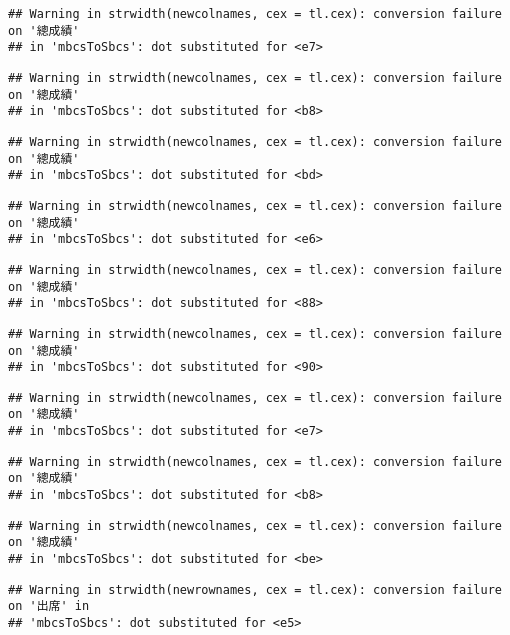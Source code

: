 \documentclass[
]{book}
\begin{document}
\begin{verbatim}
## Warning in strwidth(newcolnames, cex = tl.cex): conversion failure on '總成績'
## in 'mbcsToSbcs': dot substituted for <e7>
\end{verbatim}

\begin{verbatim}
## Warning in strwidth(newcolnames, cex = tl.cex): conversion failure on '總成績'
## in 'mbcsToSbcs': dot substituted for <b8>
\end{verbatim}

\begin{verbatim}
## Warning in strwidth(newcolnames, cex = tl.cex): conversion failure on '總成績'
## in 'mbcsToSbcs': dot substituted for <bd>
\end{verbatim}

\begin{verbatim}
## Warning in strwidth(newcolnames, cex = tl.cex): conversion failure on '總成績'
## in 'mbcsToSbcs': dot substituted for <e6>
\end{verbatim}

\begin{verbatim}
## Warning in strwidth(newcolnames, cex = tl.cex): conversion failure on '總成績'
## in 'mbcsToSbcs': dot substituted for <88>
\end{verbatim}

\begin{verbatim}
## Warning in strwidth(newcolnames, cex = tl.cex): conversion failure on '總成績'
## in 'mbcsToSbcs': dot substituted for <90>
\end{verbatim}

\begin{verbatim}
## Warning in strwidth(newcolnames, cex = tl.cex): conversion failure on '總成績'
## in 'mbcsToSbcs': dot substituted for <e7>
\end{verbatim}

\begin{verbatim}
## Warning in strwidth(newcolnames, cex = tl.cex): conversion failure on '總成績'
## in 'mbcsToSbcs': dot substituted for <b8>
\end{verbatim}

\begin{verbatim}
## Warning in strwidth(newcolnames, cex = tl.cex): conversion failure on '總成績'
## in 'mbcsToSbcs': dot substituted for <be>
\end{verbatim}

\begin{verbatim}
## Warning in strwidth(newrownames, cex = tl.cex): conversion failure on '出席' in
## 'mbcsToSbcs': dot substituted for <e5>
\end{verbatim}
\end{document}
